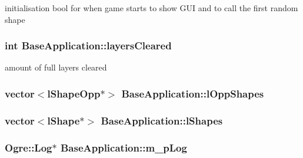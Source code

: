 initialisation bool for when game starts to show G\-U\-I and to call the first random shape \hypertarget{class_base_application_a854f2a19c04bc06c187fcf5f771966cc}{
\subsubsection[{layers\-Cleared}]{\setlength{\rightskip}{0pt plus 5cm}int Base\-Application\-::layers\-Cleared\hspace{0.3cm}{\ttfamily [protected]}}}\label{class_base_application_a854f2a19c04bc06c187fcf5f771966cc}
amount of full layers cleared \hypertarget{class_base_application_ad4c357854ba045adac9bd2016452bb8b}{
\subsubsection[{l\-Opp\-Shapes}]{\setlength{\rightskip}{0pt plus 5cm}vector$<${\bf l\-Shape\-Opp}$\ast$$>$ Base\-Application\-::l\-Opp\-Shapes\hspace{0.3cm}{\ttfamily [protected]}}}\label{class_base_application_ad4c357854ba045adac9bd2016452bb8b}
\hypertarget{class_base_application_a064956fbdf1b5ae2c187530ec7642b68}{
\subsubsection[{l\-Shapes}]{\setlength{\rightskip}{0pt plus 5cm}vector$<${\bf l\-Shape}$\ast$$>$ Base\-Application\-::l\-Shapes\hspace{0.3cm}{\ttfamily [protected]}}}\label{class_base_application_a064956fbdf1b5ae2c187530ec7642b68}
\hypertarget{class_base_application_a24c535ef10e1f77e477e0adc783b2245}{
\subsubsection[{m\-\_\-p\-Log}]{\setlength{\rightskip}{0pt plus 5cm}Ogre\-::\-Log$\ast$ Base\-Application\-::m\-\_\-p\-Log\hspace{0.3cm}{\ttfamily [protected]}}}\label{class_base_application_a24c535ef10e1f77e477e0adc783b2245}
